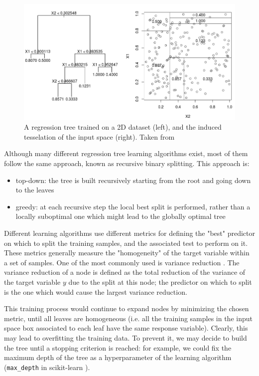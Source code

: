 \begin{figure}[hbt!]
    \centering
    \includegraphics[width=\textwidth]{images/regr_tree}
    \caption[A regression tree and the induced tesselation of the input space]{A regression tree trained on a 2D dataset (left), and the induced tesselation of the input space (right). Taken from \cite{regr_tree_img}}
    \label{fig:regr_tree}
\end{figure}

Although many different regression tree learning algorithms exist, most of them follow the same approach, known as recursive binary splitting. This approach is:
\begin{itemize}
    \item top-down: the tree is built recursively starting from the root and going down to the leaves
    \item greedy: at each recursive step the local best split is performed, rather than a locally suboptimal one which might lead to the globally optimal tree
\end{itemize}

Different learning algorithms use different metrics for defining the "best" predictor on which to split the training samples, and the associated test to perform on it. These metrics generally measure the "homogeneity" of the target variable within a set of samples. One of the most commonly used is variance reduction \cite{variance_reduction}. The variance reduction of a node is defined as the total reduction of the variance of the target variable $y$ due to the split at this node; the predictor on which to split is the one which would cause the largest variance reduction.

This training process would continue to expand nodes by minimizing the chosen metric, until all leaves are homogeneous (i.e. all the training samples in the input space box associated to each leaf have the same response variable). Clearly, this may lead to overfitting the training data. To prevent it, we may decide to build the tree until a stopping criterion is reached: for example, we could fix the maximum depth of the tree as a hyperparameter of the learning algorithm (\texttt{max\_depth} in scikit-learn \cite{sklearn_random_forest}).

